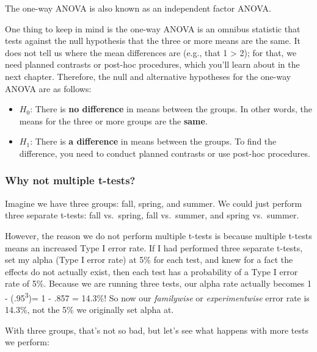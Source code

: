 \documentclass[
]{book}
\providecommand{\tightlist}{%
  \setlength{\itemsep}{0pt}\setlength{\parskip}{0pt}}
\begin{document}
The one-way ANOVA is also known as an independent factor ANOVA.

One thing to keep in mind is the one-way ANOVA is an omnibus statistic that tests against the null hypothesis that the three or more means are the same. It does not tell us where the mean differences are (e.g., that 1 \textgreater{} 2); for that, we need planned contrasts or post-hoc procedures, which you'll learn about in the next chapter. Therefore, the null and alternative hypotheses for the one-way ANOVA are as follows:

\begin{itemize}
\tightlist
\item
  \(H_0\): There is \textbf{no difference} in means between the groups. In other words, the means for the three or more groups are the \textbf{same}.
\item
  \(H_1\): There is \textbf{a difference} in means between the groups. To find the difference, you need to conduct planned contrasts or use post-hoc procedures.
\end{itemize}

\hypertarget{why-not-multiple-t-tests}{%
\subsubsection{Why not multiple t-tests?}\label{why-not-multiple-t-tests}}

Imagine we have three groups: fall, spring, and summer. We could just perform three separate t-tests: fall vs.~spring, fall vs.~summer, and spring vs.~summer.

However, the reason we do not perform multiple t-tests is because multiple t-tests means an increased Type I error rate. If I had performed three separate t-tests, set my alpha (Type I error rate) at 5\% for each test, and knew for a fact the effects do not actually exist, then each test has a probability of a Type I error rate of 5\%. Because we are running three tests, our alpha rate actually becomes 1 - (.95\textsuperscript{3})= 1 - .857 = 14.3\%! So now our \emph{familywise} or \emph{experimentwise} error rate is 14.3\%, not the 5\% we originally set alpha at.

With three groups, that's not so bad, but let's see what happens with more tests we perform:
\end{document}
